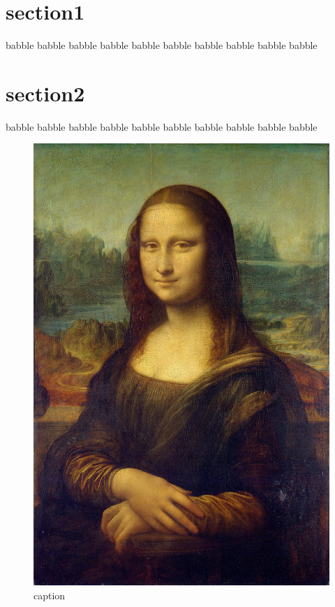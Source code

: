\section{section1}

babble babble babble babble babble babble babble babble babble babble

\section{section2}
babble babble babble babble babble babble babble babble babble babble
\begin{figure}[h!]
    \centering
    \includegraphics[width=0.5\linewidth]{Figures/Mona_Lisa.jpg}
    \caption{caption}
    \label{fig:illustris}
\end{figure}
